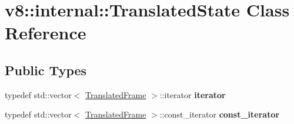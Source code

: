 \hypertarget{classv8_1_1internal_1_1TranslatedState}{}\section{v8\+:\+:internal\+:\+:Translated\+State Class Reference}
\label{classv8_1_1internal_1_1TranslatedState}
\subsection*{Public Types}
\begin{DoxyCompactItemize}
\item 
\mbox{\label{classv8_1_1internal_1_1TranslatedState_a153eb09bc74719d6fb259982cf8fcdc2}} 
typedef std\+::vector$<$ \mbox{\hyperlink{classv8_1_1internal_1_1TranslatedFrame}{Translated\+Frame}} $>$\+::iterator {\bfseries iterator}
\item 
\mbox{\label{classv8_1_1internal_1_1TranslatedState_a26e186a96d8e29d5738e3a0b38fd3d37}} 
typedef std\+::vector$<$ \mbox{\hyperlink{classv8_1_1internal_1_1TranslatedFrame}{Translated\+Frame}} $>$\+::const\+\_\+iterator {\bfseries const\+\_\+iterator}
\end{DoxyCompactItemize}
